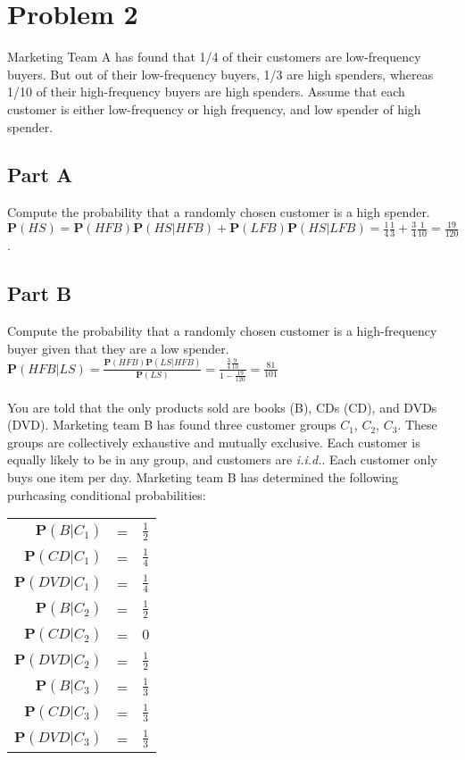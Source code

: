 \documentclass{amsart}
\begin{document}
	\section{Problem 2}
	Marketing Team A has found that 1/4 of their customers are low-frequency buyers. But out of their low-frequency buyers, 1/3 are high spenders, whereas 1/10 of their high-frequency buyers are high spenders. Assume that each customer is either low-frequency or high frequency, and low spender of high spender.\\
	\subsection{Part A}
	Compute the probability that a randomly chosen customer is a high spender.\\
	$\mathbf{P}(HS)=\mathbf{P}(HFB)\mathbf{P}(HS|HFB)+\mathbf{P}(LFB)\mathbf{P}(HS|LFB)=\frac{1}{4}\frac{1}{3}+\frac{3}{4}\frac{1}{10} = \frac{19}{120}$.\\
	\subsection{Part B}
	Compute the probability that a randomly chosen customer is a high-frequency buyer given that they are a low spender.\\
	$\mathbf{P}(HFB|LS) = \frac{\mathbf{P}(HFB)\mathbf{P}(LS|HFB)}{\mathbf{P}(LS)} = \frac{\frac{3}{4}\frac{9}{10}}{1-\frac{19}{120}}=\frac{81}{101}$\\\\
	You are told that the only products sold are books (B), CDs (CD), and DVDs (DVD). Marketing team B has found three customer groups $C_1$, $C_2$, $C_3$. These groups are collectively exhaustive and mutually exclusive. Each customer is equally likely to be in any group, and customers are \textit{i.i.d.}. Each customer only buys one item per day. Marketing team B has determined the following purhcasing conditional probabilities:\\
	\begin{table}[h!]
		\centering
		\begin{tabular}{rcl}
			$\mathbf{P}(B|C_1)$&=&$\frac{1}{2}$\\
			$\mathbf{P}(CD|C_1)$&=&$\frac{1}{4}$\\
			$\mathbf{P}(DVD|C_1)$&=&$\frac{1}{4}$\\
			$\mathbf{P}(B|C_2)$&=&$\frac{1}{2}$\\
			$\mathbf{P}(CD|C_2)$&=&$0$\\
			$\mathbf{P}(DVD|C_2)$&=&$\frac{1}{2}$\\
			$\mathbf{P}(B|C_3)$&=&$\frac{1}{3}$\\
			$\mathbf{P}(CD|C_3)$&=&$\frac{1}{3}$\\
			$\mathbf{P}(DVD|C_3)$&=&$\frac{1}{3}$
		\end{tabular}
	\end{table}
\end{document}
